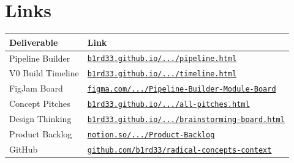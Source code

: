 \documentclass[11pt,a4paper]{article}
\begin{document}
\section{Links}

\renewcommand{\arraystretch}{1.5}
\begin{tabularx}{\textwidth}{@{}>{\small}l >{\small}X@{}}
  \arrayrulecolor{border}\toprule
  \textbf{Deliverable} & \textbf{Link} \\
  \midrule
  Pipeline Builder    & \href{https://b1rd33.github.io/radical-concepts-context/pipeline.html}{\texttt{b1rd33.github.io/.../pipeline.html}} \\
  V0 Build Timeline   & \href{https://b1rd33.github.io/radical-concepts-context/timeline.html}{\texttt{b1rd33.github.io/.../timeline.html}} \\
  FigJam Board        & \href{https://www.figma.com/board/qn14Rb37na3RAdAAYPqv7E/Pipeline-Builder-Module-Board}{\texttt{figma.com/.../Pipeline-Builder-Module-Board}} \\
  Concept Pitches     & \href{https://b1rd33.github.io/radical-concepts-context/radical-concepts-all-pitches.html}{\texttt{b1rd33.github.io/.../all-pitches.html}} \\
  Design Thinking     & \href{https://b1rd33.github.io/radical-concepts-context/i2p-brainstorming-board.html}{\texttt{b1rd33.github.io/.../brainstorming-board.html}} \\
  Product Backlog     & \href{https://www.notion.so/Product-Backlog-8304d347036283f7981b819cf684f990}{\texttt{notion.so/.../Product-Backlog}} \\
  GitHub              & \href{https://github.com/b1rd33/radical-concepts-context}{\texttt{github.com/b1rd33/radical-concepts-context}} \\
  \bottomrule
\end{tabularx}
\renewcommand{\arraystretch}{1}
\end{document}
